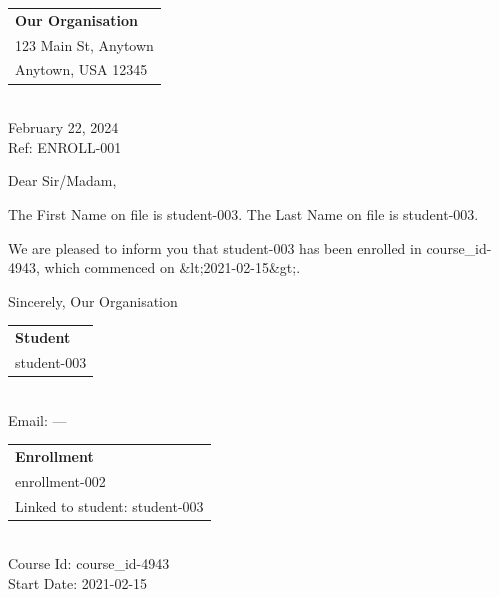 \documentclass{article}
\begin{document}
\begin{tabular}{@{}l@{}}
\textbf{Our Organisation} \\
123 Main St, Anytown \\
Anytown, USA 12345 \\
\end{tabular}\par
\vspace{-1.5em}
\\
February 22, 2024 \\
Ref: ENROLL-001

Dear Sir/Madam,

The First Name on file is student-003.
The Last Name on file is student-003.

We are pleased to inform you that student-003 has been enrolled in course\_id-4943, which commenced on \&lt;2021-02-15\&gt;.

Sincerely,
Our Organisation

\begin{tabular}{@{}l@{}}
\textbf{Student} \\
student-003 \\
\end{tabular}\par
\vspace{-1.5em}
\\
Email: --- \\

\begin{tabular}{@{}l@{}}
\textbf{Enrollment} \\
enrollment-002 \\
Linked to student: student-003 \\
\end{tabular}\par
\vspace{-1.5em}
\\
Course Id: course\_id-4943 \\
Start Date: 2021-02-15
\end{document}
